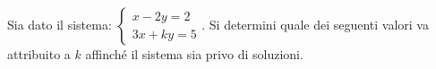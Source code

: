 Sia dato il sistema: $\left\{\begin{matrix}x-2y=2\\3x+\mathit{ky}=5\end{matrix}\right.$.
Si determini quale dei seguenti valori va attribuito a $k$ affinché il sistema sia privo di soluzioni.
